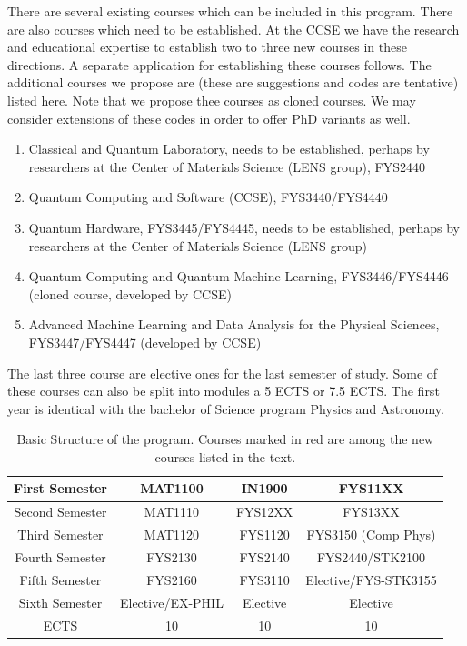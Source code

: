 \documentclass[aps,rmp,preprint,amsmath,amssymb,graphicx,longbibliography]{revtex4-1}
\begin{document}
There are several existing courses which can be included in this program. There are also courses which need to be established. At the CCSE we have the research and educational expertise to establish two to three new courses in these directions.
A separate application for establishing these courses follows. The additional courses we propose are (these are suggestions and codes are tentative) listed here. Note that we propose thee courses as cloned courses. We may consider extensions of these codes in order to offer PhD variants as well.



\begin{enumerate}
    \item \color{red} Classical and Quantum Laboratory, needs to be established, perhaps by researchers at the Center of Materials Science (LENS group), FYS2440
    \item Quantum Computing and Software (CCSE), FYS3440/FYS4440
    \item Quantum Hardware, FYS3445/FYS4445, needs to be established, perhaps by researchers at the Center of Materials Science (LENS group)
    \item Quantum Computing and Quantum Machine Learning, FYS3446/FYS4446 (cloned course, developed by CCSE)
    \item Advanced Machine Learning and Data Analysis for the Physical Sciences, FYS3447/FYS4447 (developed by CCSE)
\end{enumerate}

The last three course are elective ones for the last semester of study. Some of these courses can also be split into modules a 5 ECTS or 7.5 ECTS.
The first year is identical with the bachelor of Science program Physics and Astronomy.

\begin{table}
 \caption{Basic Structure of the program. Courses marked in red are among the new courses listed in the text.}
    \centering
    \begin{tabular}{|c|c|c|c|} \hline
    First Semester & MAT1100 &  IN1900   & FYS11XX  \\ \hline 
    Second Semester & MAT1110 & FYS12XX  & FYS13XX \\ \hline
    Third Semester & MAT1120 &   FYS1120  &  FYS3150 (Comp Phys)\\ \hline
    Fourth Semester & FYS2130 & FYS2140    & \color{red} {FYS2440}/STK2100 \\ \hline       
    Fifth Semester & FYS2160 & FYS3110     & \color{red}Elective/FYS-STK3155 \\ \hline
    Sixth Semester & \color{red} Elective/EX-PHIL & \color{red} Elective    & \color{red} Elective \\ \hline
   ECTS & 10 &  10   &  10  \\ \hline    
    \end{tabular}
\end{table}



\end{document}
